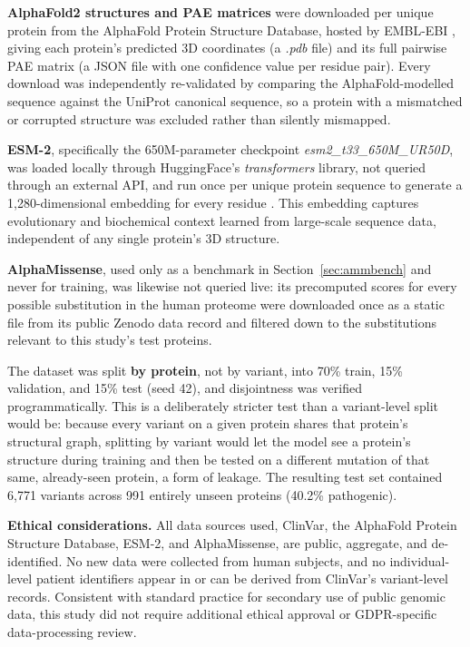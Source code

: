 \documentclass[10pt,conference,a4paper]{IEEEtran}
\begin{document}
\textbf{AlphaFold2 structures and PAE matrices} were downloaded per unique protein from the AlphaFold Protein Structure Database, hosted by EMBL-EBI \cite{jumper2021alphafold, varadi2022alphafolddb}, giving each protein's predicted 3D coordinates (a \textit{.pdb} file) and its full pairwise PAE matrix (a JSON file with one confidence value per residue pair). Every download was independently re-validated by comparing the AlphaFold-modelled sequence against the UniProt canonical sequence, so a protein with a mismatched or corrupted structure was excluded rather than silently mismapped.

\textbf{ESM-2}, specifically the 650M-parameter checkpoint \textit{esm2\_t33\_650M\_UR50D}, was loaded locally through HuggingFace's \textit{transformers} library, not queried through an external API, and run once per unique protein sequence to generate a 1{,}280-dimensional embedding for every residue \cite{lin2023esm2}. This embedding captures evolutionary and biochemical context learned from large-scale sequence data, independent of any single protein's 3D structure.

\textbf{AlphaMissense}, used only as a benchmark in Section~\ref{sec:ammbench} and never for training, was likewise not queried live: its precomputed scores for every possible substitution in the human proteome were downloaded once as a static file from its public Zenodo data record \cite{cheng2023alphamissensedata} and filtered down to the substitutions relevant to this study's test proteins.

The dataset was split \textbf{by protein}, not by variant, into 70\% train, 15\% validation, and 15\% test (seed 42), and disjointness was verified programmatically. This is a deliberately stricter test than a variant-level split would be: because every variant on a given protein shares that protein's structural graph, splitting by variant would let the model see a protein's structure during training and then be tested on a different mutation of that same, already-seen protein, a form of leakage. The resulting test set contained 6{,}771 variants across 991 entirely unseen proteins (40.2\% pathogenic).

\textbf{Ethical considerations.} All data sources used, ClinVar, the AlphaFold Protein Structure Database, ESM-2, and AlphaMissense, are public, aggregate, and de-identified. No new data were collected from human subjects, and no individual-level patient identifiers appear in or can be derived from ClinVar's variant-level records. Consistent with standard practice for secondary use of public genomic data, this study did not require additional ethical approval or GDPR-specific data-processing review.
\end{document}
